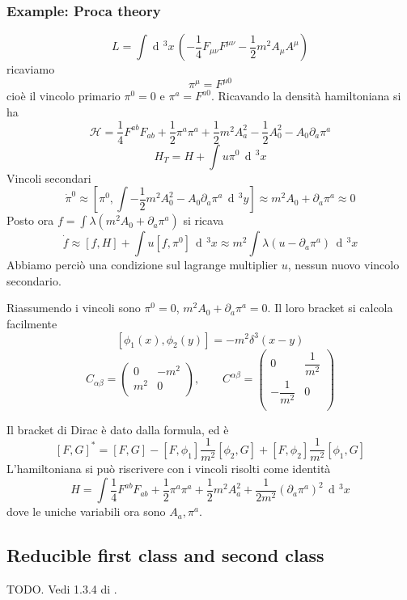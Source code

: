 \documentclass[a4paper, 11pt]{article}
\newcommand{\dd}{\mathop{\mathrm{d}\!}{}}
\begin{document}
	\subsubsection{Example: Proca theory}
	\[ L = \int \dd^3 x\, \left(-\dfrac{1}{4} F_{\mu\nu}F^{\mu\nu} - \dfrac{1}{2} m^2 A_\mu A^\mu \right) \]
	ricaviamo
	\[ \pi^\mu = F^{\mu 0} \]
	cioè il vincolo primario $\pi^0=0$ e $\pi^a = F^{a0}$. Ricavando la densità hamiltoniana si ha
	\[ \mathcal{H} = \dfrac{1}{4} F^{ab}F_{ab} + \dfrac{1}{2} \pi^a\pi^a + \dfrac{1}{2} m^2 A_a^2 - \dfrac{1}{2} A_0^2 - A_0 \partial_a \pi^a \]
	\[ H_T = H + \int u\pi^0\,\dd^3 x \]
	Vincoli secondari
	\[ \dot{\pi}^0 \approx \left[ \pi^0, \int -\dfrac{1}{2} m^2 A_0^2 - A_0 \partial_a \pi^a\,\dd^3 y \right] \approx m^2 A_0 + \partial_a \pi^a \approx 0 \]
	Posto ora $f = \int \lambda \left( m^2 A_0 + \partial_a \pi^a \right)$ si ricava
	\[ \dot{f} \approx [f,H] + \int u [f,\pi^0]\,\dd^3 x \approx m^2 \int \lambda \left(u-\partial_a\pi^a\right)\,\dd^3 x \]
	Abbiamo perciò una condizione sul lagrange multiplier $u$, nessun nuovo vincolo secondario.
	
	Riassumendo i vincoli sono $\pi^0 = 0$, $m^2A_0 + \partial_a \pi^a = 0$. Il loro bracket si calcola facilmente
	\[ [\phi_1(x), \phi_2(y)] = -m^2 \delta^3(x-y) \]
	\[ C_{\alpha\beta} = \begin{pmatrix}
	0 & -m^2 \\
	m^2 & 0 \\
	\end{pmatrix},\qquad
	C^{\alpha\beta} = \begin{pmatrix}
	0 & \dfrac{1}{m^2} \\
	-\dfrac{1}{m^2} & 0 \\
	\end{pmatrix} \]
	
	Il bracket di Dirac è dato dalla formula, ed è
	\[ [F,G]^* = [F,G] - [F,\phi_1]\dfrac{1}{m^2}[\phi_2,G] + [F,\phi_2]\dfrac{1}{m^2}[\phi_1,G] \]
	L'hamiltoniana si può riscrivere con i vincoli risolti come identità
	\[ H = \int \dfrac{1}{4} F^{ab}F_{ab} + \dfrac{1}{2} \pi^a\pi^a + \dfrac{1}{2} m^2 A_a^2 + \dfrac{1}{2m^2} (\partial_a \pi^a)^2\,\dd^3 x \]
	dove le uniche variabili ora sono $A_a,\pi^a$.
	
	\subsection{Reducible first class and second class}
	TODO. Vedi 1.3.4 di \cite{HT}.
	
	\newpage
	
\end{document}
